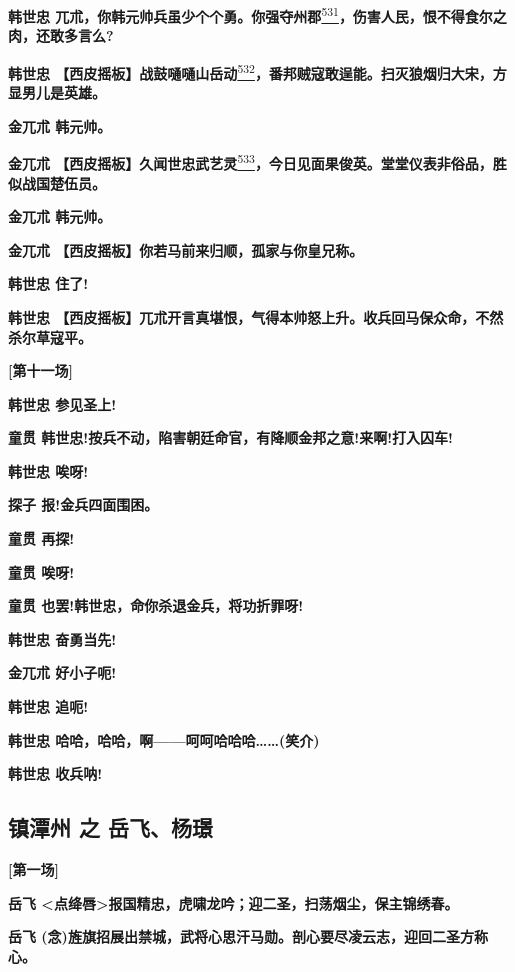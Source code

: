 \textbf{韩世忠
兀朮，你韩元帅兵虽少个个勇。你强夺州郡}\protect\hyperlink{fn531}{\textsuperscript{531}}\textbf{，伤害人民，恨不得食尔之肉，还敢多言么?}

\textbf{韩世忠
【西皮摇板】战鼓嗵嗵山岳动}\protect\hyperlink{fn532}{\textsuperscript{532}}\textbf{，番邦贼寇敢逞能。扫灭狼烟归大宋，方显男儿是英雄。}

\textbf{金兀朮 韩元帅。}

\textbf{金兀朮
【西皮摇板】久闻世忠武艺灵}\protect\hyperlink{fn533}{\textsuperscript{533}}\textbf{，今日见面果俊英。堂堂仪表非俗品，胜似战国楚伍员。}

\textbf{金兀朮 韩元帅。}

\textbf{金兀朮 【西皮摇板】你若马前来归顺，孤家与你皇兄称。}

\textbf{韩世忠 住了!}

\textbf{韩世忠
【西皮摇板】兀朮开言真堪恨，气得本帅怒上升。收兵回马保众命，不然杀尔草寇平。}

\textbf{{[}第十一场{]}}

\textbf{韩世忠 参见圣上!}

\textbf{童贯
韩世忠!按兵不动，陷害朝廷命官，有降顺金邦之意!来啊!打入囚车!}

\textbf{韩世忠 唉呀!}

\textbf{探子 报!金兵四面围困。}

\textbf{童贯 再探!}

\textbf{童贯 唉呀!}

\textbf{童贯 也罢!韩世忠，命你杀退金兵，将功折罪呀!}

\textbf{韩世忠 奋勇当先!}

\textbf{金兀朮 好小子呃!}

\textbf{韩世忠 追呃!}

\textbf{韩世忠 哈哈，哈哈，啊------呵呵哈哈哈\ldots{}\ldots{}(笑介)}

\textbf{韩世忠 收兵呐!}

\hypertarget{ux9547ux6f6dux5dde-ux4e4b-ux5cb3ux98deux6768ux749f}{%
\subsection{镇潭州 之
岳飞、杨璟}\label{ux9547ux6f6dux5dde-ux4e4b-ux5cb3ux98deux6768ux749f}}

\textbf{{[}第一场{]}}

\textbf{岳飞
\textless{}点绛唇\textgreater{}报国精忠，虎啸龙吟；迎二圣，扫荡烟尘，保主锦绣春。}

\textbf{岳飞
(念)旌旗招展出禁城，武将心思汗马勋。剖心要尽凌云志，迎回二圣方称心。}

